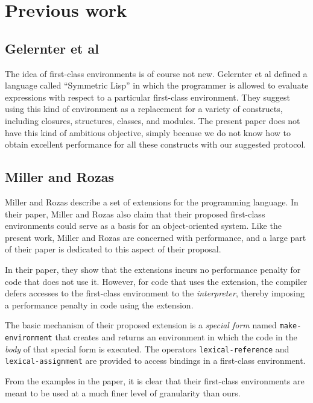 \section{Previous work}

\subsection{Gelernter et al}

The idea of first-class environments is of course not new.
Gelernter et al \cite{Gelernter:1987:EFC:41625.41634} defined a
language called ``Symmetric Lisp'' in which the programmer is allowed
to evaluate expressions with respect to a particular first-class
environment.  They suggest using this kind of environment as a
replacement for a variety of constructs, including closures,
structures, classes, and modules.  The present paper does not have
this kind of ambitious objective, simply because we do not know how to
obtain excellent performance for all these constructs with our
suggested protocol.

\subsection{Miller and Rozas}

Miller and Rozas \cite{Miller:1991:FVF:113825.113826} describe a set
of extensions for the \scheme{} programming language.  In their paper,
Miller and Rozas also claim that their proposed first-class
environments could serve as a basis for an object-oriented system.
Like the present work, Miller and Rozas are concerned with
performance, and a large part of their paper is dedicated to this
aspect of their proposal.

In their paper, they show that the extensions incurs no performance
penalty for code that does not use it.  However, for code that uses
the extension, the compiler defers accesses to the first-class
environment to the \emph{interpreter}, thereby imposing a performance
penalty in code using the extension.

The basic mechanism of their proposed extension is a \emph{special
  form} named \texttt{make-environment} that creates and returns an
environment in which the code in the \emph{body} of that special form
is executed.  The operators \texttt{lexical-reference} and
\texttt{lexical-assignment} are provided to access bindings in a
first-class environment.

From the examples in the paper, it is clear that their first-class
environments are meant to be used at a much finer level of granularity
than ours.

